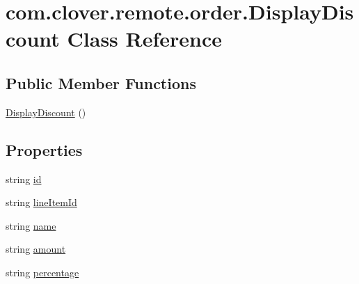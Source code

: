 \hypertarget{classcom_1_1clover_1_1remote_1_1order_1_1_display_discount}{}\section{com.\+clover.\+remote.\+order.\+Display\+Discount Class Reference}
\label{classcom_1_1clover_1_1remote_1_1order_1_1_display_discount}
\subsection*{Public Member Functions}
\begin{DoxyCompactItemize}
\item 
\hyperlink{classcom_1_1clover_1_1remote_1_1order_1_1_display_discount_a7d759ca2c3b810d61e6ed6f2f632854e}{Display\+Discount} ()
\end{DoxyCompactItemize}
\subsection*{Properties}
\begin{DoxyCompactItemize}
\item 
string \hyperlink{classcom_1_1clover_1_1remote_1_1order_1_1_display_discount_acb785f196d7195fd780ef3b9c4a60641}{id}
\item 
string \hyperlink{classcom_1_1clover_1_1remote_1_1order_1_1_display_discount_a44c2e4eb2f4fa2585f54b6e80fd3f55d}{line\+Item\+Id}
\item 
string \hyperlink{classcom_1_1clover_1_1remote_1_1order_1_1_display_discount_a0cfce5595f1918ca2f49c9b92003d65f}{name}
\item 
string \hyperlink{classcom_1_1clover_1_1remote_1_1order_1_1_display_discount_a675ce8ffc39b916aefe5d246a7aec5bb}{amount}
\item 
string \hyperlink{classcom_1_1clover_1_1remote_1_1order_1_1_display_discount_a98f6bfed530a89d304b48cfd3f76ce6c}{percentage}
\end{DoxyCompactItemize}


